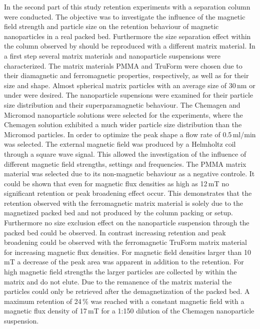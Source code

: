 In the second part of this study retention experiments with a separation column were conducted. The objective was to investigate the influence of the magnetic field strength and particle size on the retention behaviour of magnetic nanoparticles in a real packed bed. Furthermore the size separation effect within the column observed by \cite{AndreMaster} should be reproduced with a different matrix material. 
In a first step several matrix materials and nanoparticle suspensions were characterized. The matrix materials PMMA and TruForm were chosen due to their diamagnetic and ferromagnetic properties, respectively, as well as for their size and shape. Almost spherical matrix particles with an average size of 30\,nm or under were desired. The nanoparticle supensions were examined for their particle size distribution and their superparamagnetic behaviour. The Chemagen and Micromod nanoparticle solutions were selected for the experiments, where the Chemagen solution exhibited a much wider particle size distribution than the Micromod particles. In order to optimize the peak shape a flow rate of 0.5\,ml/min was selected. The external magnetic field  was produced by a Helmholtz coil through a square wave signal. This allowed the investigation of the influence of different magnetic field strengths, settings and frequencies. The PMMA matrix material was selected due to its non-magnetic behaviour as a negative controle. It could be shown that even for magnetic flux densities as high as 12\,mT no significant retention or peak broadening effect occur. This demonstrates that the retention observed with the ferromagnetic matrix material is solely due to the magnetized packed bed and not produced by the column packing or setup. Furthermore no size exclusion effect on the nanoparticle suspension through the packed bed could be observed. In contrast increasing retention and peak broadening could be observed with the ferromagnetic TruForm matrix material for increasing magnetic flux densities. For magnetic field densities larger than 10\,mT a decrease of the peak area was apparent in addition to the retention. For high magnetic field strengths the larger particles are collected by within the matrix and do not elute. Due to the remanence of the matrix material the particles could only be retrieved after the demagnetization of the packed bed. A maximum retention of 24\,\% was reached with a  constant magnetic field with a magnetic flux density of 17\,mT for a 1:150 dilution of the Chemagen nanoparticle suspension. 


